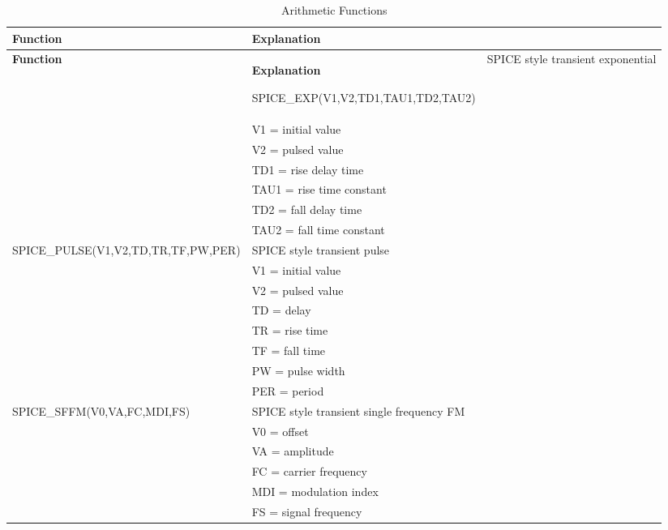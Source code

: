 

{\renewcommand{\arraystretch}{1.2}
  \newcommand{\category}[1]{\multicolumn{2}{c}{\smallskip\color{XyceDarkBlue}\em\bfseries #1}}
  \begin{longtable}{>{\raggedright\small}m{2.5in}>{\raggedright\let\\\tabularnewline\small}m{2.5in}}
    \caption{SPICE Compatibility Functions\label{SPICE_Functions}} \\ \hline
    \color{white}\bf Function &
    \color{white}\bf Explanation \endfirsthead
    \caption[]{Arithmetic Functions} \\ \hline
    \color{white}\bf Function &
    \color{white}\bf Explanation \endhead

    SPICE\_EXP(V1,V2,TD1,TAU1,TD2,TAU2)  & SPICE style transient exponential \\
     & V1 = initial value \\
     & V2 = pulsed value \\
     & TD1 = rise delay time \\
     & TAU1 = rise time constant \\
     & TD2 = fall delay time \\
     & TAU2 = fall time constant \\ \hline

    SPICE\_PULSE(V1,V2,TD,TR,TF,PW,PER) & SPICE style transient pulse \\
     & V1 = initial value \\
     & V2 = pulsed value \\
     & TD = delay \\
     & TR = rise time \\
     & TF = fall time \\
     & PW = pulse width \\
     & PER = period \\ \hline

    SPICE\_SFFM(V0,VA,FC,MDI,FS) & SPICE style transient single frequency FM \\
     & V0 = offset \\
     & VA = amplitude \\
     & FC = carrier frequency \\
     & MDI = modulation index \\
     & FS = signal frequency \\ \hline


\end{longtable}}
